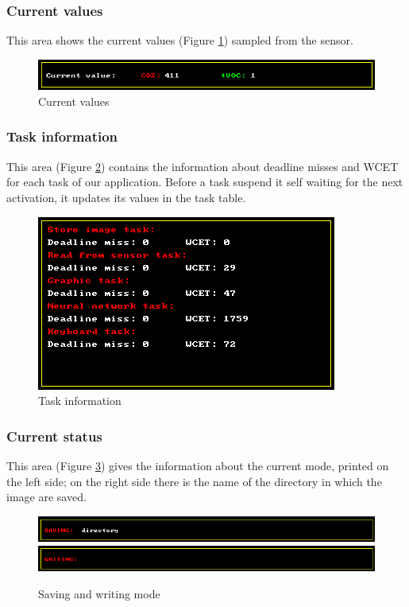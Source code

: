 \documentclass[12pt]{article}
\begin{document}
\subsubsection*{Current values}
This area shows the current values (Figure \ref{values}) sampled from the sensor.

\begin{figure}[H]
    \centering
    \includegraphics[width=\textwidth]{images/values.png}
    \caption{Current values}
    \label{values}
\end{figure}

\subsubsection*{Task information}
This area (Figure \ref{task_info}) contains the information about deadline
misses and WCET for each task of our application. Before a task suspend it self
waiting for the next activation, it updates its values in the task table.

\begin{figure}[H]
    \centering
    \includegraphics[scale=0.75]{images/task_info.png}
    \caption{Task information}
    \label{task_info}
\end{figure}

\subsubsection*{Current status}
This area (Figure \ref{save_write}) gives the information about the current
mode, printed on the left side; on the right side there is the name of the
directory in which the image are saved.

\begin{figure}[H]
    \centering
    \includegraphics[scale=0.75]{images/saving.png}
    \includegraphics[scale=0.75]{images/writing.png}
    \caption{Saving and writing mode}
    \label{save_write}
\end{figure}
\end{document}
